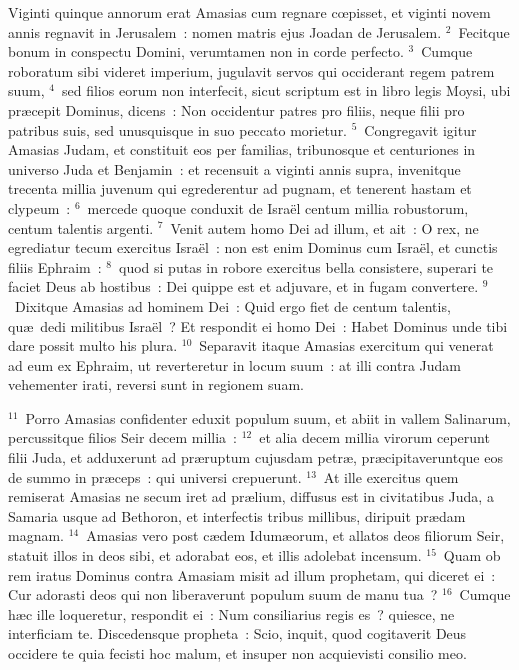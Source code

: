 \lettrine[lines=10,image=true,loversize=0.05,lraise=-0.03]{V}{}iginti quinque annorum erat Amasias cum regnare cœpisset, et viginti novem annis regnavit in Jerusalem~: nomen matris ejus Joadan de Jerusalem.
${}^{2}$~Fecitque bonum in conspectu Domini, verumtamen non in corde perfecto.
${}^{3}$~Cumque roboratum sibi videret imperium, jugulavit servos qui occiderant regem patrem suum,
${}^{4}$~sed filios eorum non interfecit, sicut scriptum est in libro legis Moysi, ubi pr\ae cepit Dominus, dicens~: Non occidentur patres pro filiis, neque filii pro patribus suis, sed unusquisque in suo peccato morietur.
${}^{5}$~Congregavit igitur Amasias Judam, et constituit eos per familias, tribunosque et centuriones in universo Juda et Benjamin~: et recensuit a viginti annis supra, invenitque trecenta millia juvenum qui egrederentur ad pugnam, et tenerent hastam et clypeum~:
${}^{6}$~mercede quoque conduxit de Isra\"el centum millia robustorum, centum talentis argenti.
${}^{7}$~Venit autem homo Dei ad illum, et ait~: O rex, ne egrediatur tecum exercitus Isra\"el~: non est enim Dominus cum Isra\"el, et cunctis filiis Ephraim~:
${}^{8}$~quod si putas in robore exercitus bella consistere, superari te faciet Deus ab hostibus~: Dei quippe est et adjuvare, et in fugam convertere.
${}^{9}$~Dixitque Amasias ad hominem Dei~: Quid ergo fiet de centum talentis, qu\ae\ dedi militibus Isra\"el~? Et respondit ei homo Dei~: Habet Dominus unde tibi dare possit multo his plura.
${}^{10}$~Separavit itaque Amasias exercitum qui venerat ad eum ex Ephraim, ut reverteretur in locum suum~: at illi contra Judam vehementer irati, reversi sunt in regionem suam.


${}^{11}$~Porro Amasias confidenter eduxit populum suum, et abiit in vallem Salinarum, percussitque filios Seir decem millia~:
${}^{12}$~et alia decem millia virorum ceperunt filii Juda, et adduxerunt ad pr\ae ruptum cujusdam petr\ae , pr\ae cipitaveruntque eos de summo in pr\ae ceps~: qui universi crepuerunt.
${}^{13}$~At ille exercitus quem remiserat Amasias ne secum iret ad pr\ae lium, diffusus est in civitatibus Juda, a Samaria usque ad Bethoron, et interfectis tribus millibus, diripuit pr\ae dam magnam.
${}^{14}$~Amasias vero post c\ae dem Idum\ae orum, et allatos deos filiorum Seir, statuit illos in deos sibi, et adorabat eos, et illis adolebat incensum.
${}^{15}$~Quam ob rem iratus Dominus contra Amasiam misit ad illum prophetam, qui diceret ei~: Cur adorasti deos qui non liberaverunt populum suum de manu tua~?
${}^{16}$~Cumque h\ae c ille loqueretur, respondit ei~: Num consiliarius regis es~? quiesce, ne interficiam te. Discedensque propheta~: Scio, inquit, quod cogitaverit Deus occidere te quia fecisti hoc malum, et insuper non acquievisti consilio meo.


